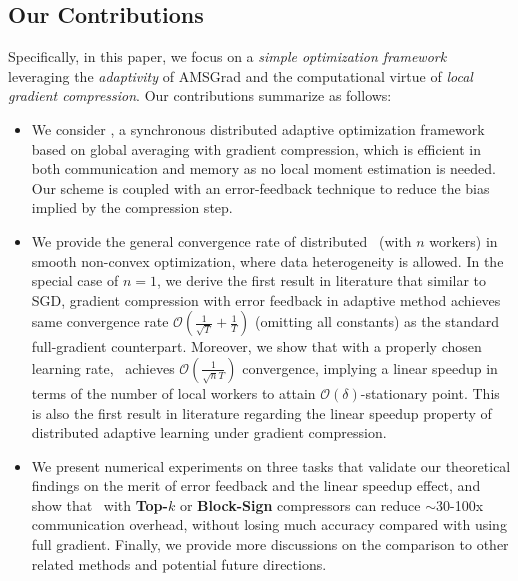 \documentclass[11pt]{article}
\begin{document}
\vspace{-0.05in}
\subsection{Our Contributions}
\vspace{-0.05in}

Specifically, in this paper, we focus on a \emph{simple optimization framework} leveraging the \emph{adaptivity} of AMSGrad and the computational virtue of \emph{local gradient compression}. Our contributions summarize as follows:
\begin{itemize}
\item We consider \algo, a synchronous distributed adaptive optimization framework based on global averaging with gradient compression, which is efficient in both communication and memory as no local moment estimation is needed. Our scheme is coupled with an error-feedback technique to reduce the bias implied by the compression step.

\item We provide the general convergence rate of distributed \algo\ (with $n$ workers) in smooth non-convex optimization, where data heterogeneity is allowed. In the special case of $n=1$, we derive the first result in literature that similar to SGD, gradient compression with error feedback in adaptive method achieves same convergence rate $\mathcal O(\frac{1}{\sqrt T}+\frac{1}{T})$ (omitting all constants) as the standard full-gradient counterpart. Moreover, we show that with a properly chosen learning rate, \algo\ achieves $\mathcal O(\frac{1}{\sqrt nT})$ convergence, implying a linear speedup in terms of the number of local workers to attain $\mathcal O(\delta)$-stationary point. This is also the first result in literature regarding the linear speedup property of distributed adaptive learning under gradient compression.


\item We present numerical experiments on three tasks that validate our theoretical findings on the merit of error feedback and the linear speedup effect, and show that \algo\ with \textbf{Top-$k$} or \textbf{Block-Sign} compressors can reduce $\sim$30-100x communication overhead, without losing much accuracy compared with using full gradient. Finally, we provide more discussions on the comparison to other related methods and potential future directions.

\end{itemize}
\end{document}
